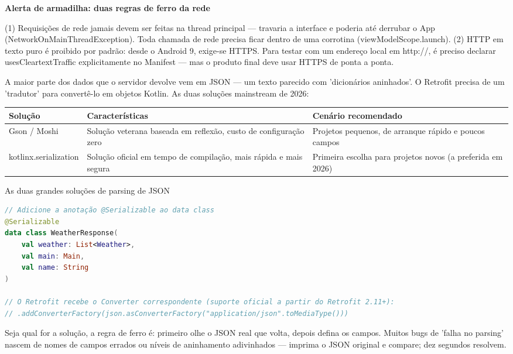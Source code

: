 \textbf{Alerta de armadilha: duas regras de ferro da rede}\par

(1) Requisições de rede jamais devem ser feitas na thread principal — travaria a interface e poderia até derrubar o App (NetworkOnMainThreadException). Toda chamada de rede precisa ficar dentro de uma corrotina (viewModelScope.launch). (2) HTTP em texto puro é proibido por padrão: desde o Android 9, exige-se HTTPS. Para testar com um endereço local em http://, é preciso declarar usesCleartextTraffic explicitamente no Manifest — mas o produto final deve usar HTTPS de ponta a ponta.


A maior parte dos dados que o servidor devolve vem em JSON — um texto parecido com 'dicionários aninhados'. O Retrofit precisa de um 'tradutor' para convertê-lo em objetos Kotlin. As duas soluções mainstream de 2026:

\begin{center}
\begin{tabularx}{\linewidth}{|X|X|X|}
\hline
\textbf{Solução} & \textbf{Características} & \textbf{Cenário recomendado} \tabularnewline
\hline
Gson / Moshi & Solução veterana baseada em reflexão, custo de configuração zero & Projetos pequenos, de arranque rápido e poucos campos \tabularnewline
kotlinx.serialization & Solução oficial em tempo de compilação, mais rápida e mais segura & Primeira escolha para projetos novos (a preferida em 2026) \tabularnewline
\hline
\end{tabularx}
\end{center}

\begin{center}\small\color{gray}As duas grandes soluções de parsing de JSON\end{center}

\begin{lstlisting}[language=Kotlin]
// Adicione a anotação @Serializable ao data class
@Serializable
data class WeatherResponse(
    val weather: List<Weather>,
    val main: Main,
    val name: String
)

// O Retrofit recebe o Converter correspondente (suporte oficial a partir do Retrofit 2.11+):
// .addConverterFactory(json.asConverterFactory("application/json".toMediaType()))
\end{lstlisting}

Seja qual for a solução, a regra de ferro é: primeiro olhe o JSON real que volta, depois defina os campos. Muitos bugs de 'falha no parsing' nascem de nomes de campos errados ou níveis de aninhamento adivinhados — imprima o JSON original e compare; dez segundos resolvem.

